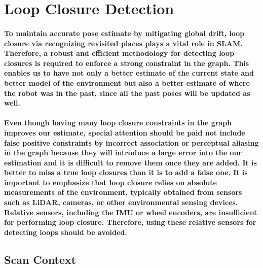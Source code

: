 \section{Loop Closure Detection}
\paragraph{\textnormal{To maintain accurate pose estimate by mitigating global drift, loop closure via recognizing revisited places plays a vital role in SLAM. Therefore, a robust and efficient methodology for detecting loop closures is required to enforce a strong constraint in the graph. This enables us to have not only a better estimate of the current state and better model of the environment but also a better estimate of where the robot was in the past, since all the past poses will be updated as well.}}
\paragraph{\textnormal{Even though having many loop closure constraints in the graph improves our estimate, special attention should be paid not include false positive constraints by incorrect association or perceptual aliasing in the graph because they will introduce a large error into the our estimation and it is difficult to remove them once they are added. It is better to miss a true loop closures than it is to add a false one. It is important to emphasize that loop closure relies on absolute measurements of the environment, typically obtained from sensors such as LiDAR, cameras, or other environmental sensing devices. Relative sensors, including the IMU or wheel encoders, are insufficient for performing loop closure. Therefore, using these relative sensors for detecting loops should be avoided.
}}

\subsection{Scan Context}
